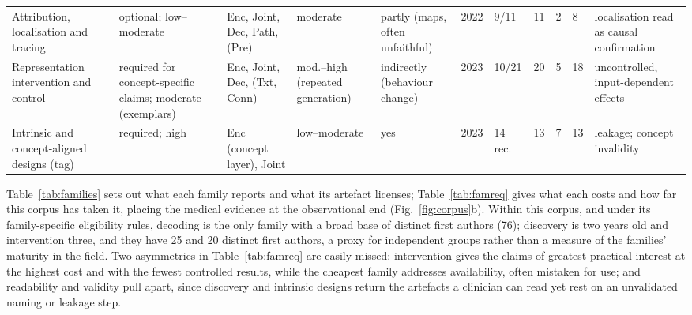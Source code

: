 \begin{table}[!tb]
\begin{tabular}{@{}L{1.86cm}L{1.75cm}L{1.76cm}L{1.33cm}L{1.53cm}C{0.6cm}C{0.89cm}C{0.92cm}C{0.72cm}C{0.75cm}L{2.2cm}@{}}
Attribution, localisation and tracing & optional; low--moderate & Enc, Joint, Dec, Path, (Pre) & moderate & partly (maps, often unfaithful) & 2022 & 9/11 & 11 & 2 & 8 & localisation read as causal confirmation \\
Representation intervention and control & required for concept-\hspace{0pt}specific claims; moderate (exemplars) & Enc, Joint, Dec, (Txt, Conn) & mod.--high (repeated generation) & indirectly (behaviour change) & 2023 & 10/21 & 20 & 5 & 18 & uncontrolled, input-\hspace{0pt}dependent effects \\
\midrule
Intrinsic and concept-aligned designs (tag) & required; high & Enc (concept layer), Joint & low--moderate & yes & 2023 & 14 rec. & 13 & 7 & 13 & leakage; concept invalidity \\
\bottomrule
\end{tabular}
\end{table}

Table~\ref{tab:families} sets out what each family reports and what its artefact licenses;
Table~\ref{tab:famreq} gives what each costs and how far this corpus has taken it, placing the medical
evidence at the observational end (Fig.~\ref{fig:corpus}b). Within this corpus, and under its family-specific eligibility rules, decoding is the only family with a broad base of distinct first authors (76); discovery is two years old and intervention three, and they have 25 and 20 distinct first authors, a proxy for independent groups rather than a measure of the families' maturity in the field. Two asymmetries in Table~\ref{tab:famreq} are easily
missed: intervention gives the claims of greatest practical interest at the highest cost and with the fewest
controlled results, while the cheapest family addresses availability, often mistaken for use; and readability
and validity pull apart, since discovery and intrinsic designs return the artefacts a clinician can read yet
rest on an unvalidated naming or leakage step.

